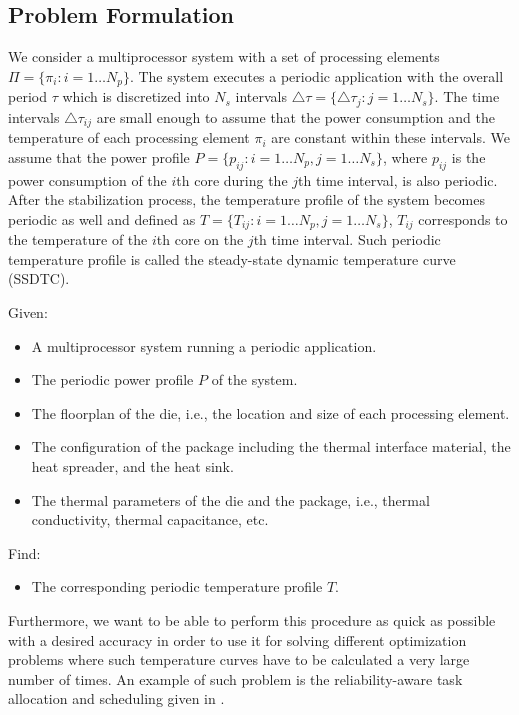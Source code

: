 \subsection{Problem Formulation}
We consider a multiprocessor system with a set of processing elements $\Pi = \{ \pi_i: i = 1 \dots N_p \}$. The system executes a periodic application with the overall period $\tau$ which is discretized into $N_s$ intervals $\triangle \tau = \{ \triangle \tau_j: j = 1 \dots N_s \}$. The time intervals $\triangle \tau_{ij}$ are small enough to assume that the power consumption and the temperature of each processing element $\pi_i$ are constant within these intervals. We assume that the power profile $P = \{ p_{ij}: i = 1 \dots N_p, j = 1 \dots N_s \}$, where $p_{ij}$ is the power consumption of the $i$th core during the $j$th time interval, is also periodic. After the stabilization process, the temperature profile of the system becomes periodic as well and defined as $T = \{ T_{ij}: i = 1 \dots N_p, j = 1 \dots N_s \}$, ${T_{ij}}$ corresponds to the temperature of the ${i}$th core on the $j$th time interval. Such periodic temperature profile is called the steady-state dynamic temperature curve (SSDTC).

Given:
\begin{itemize}
  \item A multiprocessor system running a periodic application.
  \item The periodic power profile $P$ of the system.
  \item The floorplan of the die, i.e., the location and size of each processing element.
  \item The configuration of the package including the thermal interface material, the heat spreader, and the heat sink.
  \item The thermal parameters of the die and the package, i.e., thermal conductivity, thermal capacitance, etc.
\end{itemize}
Find:
\begin{itemize}
  \item The corresponding periodic temperature profile $T$.
\end{itemize}

Furthermore, we want to be able to perform this procedure as quick as possible with a desired accuracy in order to use it for solving different optimization problems where such temperature curves have to be calculated a very large number of times. An example of such problem is the reliability-aware task allocation and scheduling given in .

